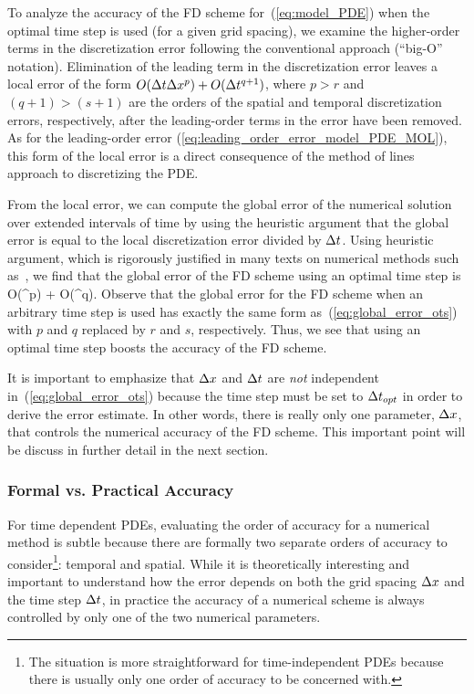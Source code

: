 \documentclass[oneeqnum,onefignum,onetabnum,onethmnum]{siamltex}
\begin{document}
To analyze the accuracy of the FD scheme for~(\ref{eq:model_PDE}) when the 
optimal time step is used (for a given grid spacing), we examine the 
higher-order terms in the discretization error following the conventional 
approach (\ie ``big-O'' notation).  Elimination of the leading term in the 
discretization error leaves a local error of the form 
$O(\Delta t \Delta x^p) + O(\Delta t^{q+1})$, where $p>r$ and $(q+1) > (s+1)$ are the orders 
of the spatial and temporal discretization errors, respectively, after the 
leading-order terms in the error have been removed.  As for the leading-order 
error (\ref{eq:leading_order_error_model_PDE_MOL}), this form of the local 
error is a direct consequence of the method of lines approach to discretizing 
the PDE.  

From the local error, we can compute the global error of the numerical 
solution over extended intervals of time by using the heuristic argument
that the global error is equal to the local discretization 
error divided by $\Delta t$.  Using heuristic argument, which is rigorously 
justified in many texts on numerical methods such as~\cite{gko_book}, we 
find that the global error of the FD scheme using an optimal time step is 
\beq
O(\dx^p) + O(\dt^q).
\label{eq:global_error_ots}
\eeq
Observe that the global error for the FD scheme when an arbitrary time
step is used has exactly the same form as~(\ref{eq:global_error_ots}) with
$p$ and $q$ replaced by $r$ and $s$, respectively.  Thus, we see that 
using an optimal time step boosts the accuracy of the FD scheme.  

It is important to emphasize that $\Delta x$ and $\Delta t$ are \emph{not} independent 
in~(\ref{eq:global_error_ots}) because the time step must be set to $\Delta t_{opt}$ 
in order to derive the error estimate.  In other words, there is really only 
one parameter, $\Delta x$, that controls the numerical accuracy of the FD scheme.  
This important point will be discuss in further detail in the next section.


\subsubsection*{Formal vs. Practical Accuracy}
For time dependent PDEs, evaluating the order of accuracy for a numerical
method is subtle because there are formally two separate orders of accuracy 
to consider\footnote{The situation is more straightforward for 
time-independent PDEs because there is usually only one order of accuracy to 
be concerned with.}:  temporal and spatial.  While it is theoretically
interesting and important to understand how the error depends on both the 
grid spacing $\Delta x$ and the time step $\Delta t$, in practice the accuracy 
of a numerical scheme is always controlled by only one of the two numerical
parameters.  
\end{document}
